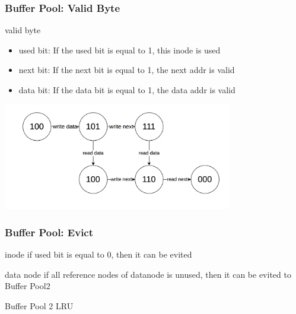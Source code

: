 \documentclass[notheorems, aspectratio=54]{beamer}
\begin{document}
\begin{frame}
    \frametitle{Buffer Pool: Valid Byte}
    \begin{block} {valid byte}
        \begin{itemize}
            \item used bit: If the used bit is equal to 1, this inode is used
            \item next bit: If the next bit is equal to 1, the next addr is valid
            \item data bit: If the data bit is equal to 1, the data addr is valid
        \end{itemize}
    \end{block}
    \centering
    \includegraphics[width=10cm]{global_img_dir/automata.png}
\end{frame}

\begin{frame}
    \frametitle{Buffer Pool: Evict}
    \begin{block} {inode}
        if used bit is equal to 0, then it can be evited
    \end{block}
    \begin{block} {data node}
        if all reference nodes of datanode is unused, then it can be evited to Buffer Pool2
    \end{block}
    \begin{block} {Buffer Pool 2}
        LRU
    \end{block}
\end{frame}
\end{document}
